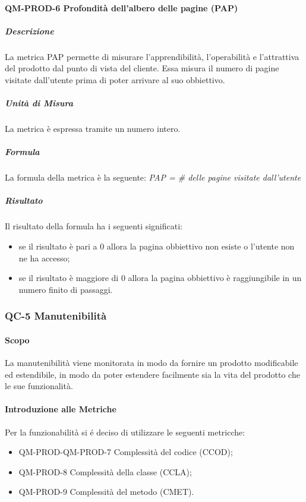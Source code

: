 			\paragraph{QM-PROD-6 Profondità dell'albero delle pagine (PAP)}
				\subparagraph{Descrizione}
					La metrica PAP permette di misurare l'apprendibilità, l'operabilità e l'attrattiva del prodotto dal punto di vista del cliente. Essa misura il numero di pagine visitate dall'utente prima di poter arrivare al suo obbiettivo.
				\subparagraph{Unità di Misura}
					La metrica è espressa tramite un numero intero.
				\subparagraph{Formula}
					La formula della metrica è la seguente:
					\textit{PAP = \# delle pagine visitate dall'utente}
				\subparagraph{Risultato}
					Il risultato della formula ha i seguenti significati:
					\begin{itemize}
						\item se il risultato è pari a 0 allora la pagina obbiettivo non esiste o l'utente non ne ha accesso;
						\item se il risultato è maggiore di 0 allora la pagina obbiettivo è raggiungibile in un numero finito di passaggi.
					\end{itemize}

		\subsubsection{QC-5 Manutenibilità}
			\paragraph{Scopo}
				La manutenibilità viene monitorata in modo da fornire un prodotto modificabile ed estendibile, in modo da poter estendere facilmente sia la vita del prodotto che le sue funzionalità.
			\paragraph{Introduzione alle Metriche}
				Per la funzionabilità si é deciso di utilizzare le seguenti metricche:
				\begin{itemize}
					\item QM-PROD-QM-PROD-7 Complessità del codice (CCOD);
					\item QM-PROD-8 Complessità della classe (CCLA);
					\item QM-PROD-9 Complessità del metodo (CMET).
				\end{itemize}
